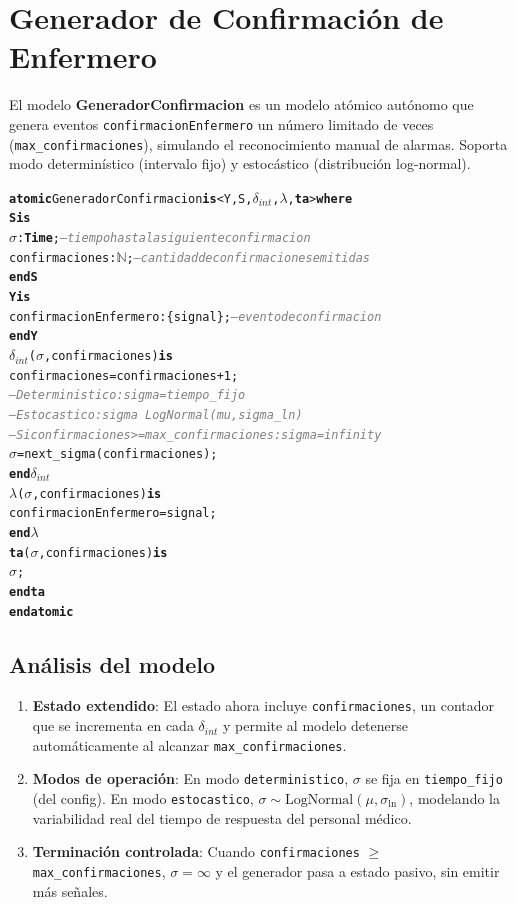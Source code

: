 \documentclass[12pt, a4paper]{article}
\newcommand{\cmlN}{$\mathbb{N}$}
\newcommand{\kw}[1]{\textbf{#1}}
\newcommand{\cmlTime}{\textbf{Time}}
\newcommand{\cmlsigma}{$\sigma$}
\newcommand{\dint}{$\delta_{\mathit{int}}$}
\newcommand{\clambda}{$\lambda$}
\newcommand{\cmlta}{\textbf{ta}}
\newcommand{\cmlcomment}[1]{\textit{\textcolor{gray}{#1}}}
\newenvironment{cmldevs}{%
  \begin{alltt}\small%
}{%
  \end{alltt}%
}
\begin{document}
\section{Generador de Confirmación de Enfermero}

El modelo \textbf{GeneradorConfirmacion} es un modelo atómico autónomo que genera
eventos \texttt{confirmacionEnfermero} un número limitado de veces
(\texttt{max\_confirmaciones}), simulando el reconocimiento manual de alarmas.
Soporta modo determinístico (intervalo fijo) y estocástico (distribución log-normal).

\begin{center}
\begin{cmldevs}
\kw{atomic} GeneradorConfirmacion \kw{is} <Y, S, \dint{}, \clambda{}, \cmlta{}> \kw{where}
\kw{S is}
    \cmlsigma{}          : \cmlTime{};  \cmlcomment{-- tiempo hasta la siguiente confirmacion}
    confirmaciones : \cmlN{};     \cmlcomment{-- cantidad de confirmaciones emitidas}
\kw{end S}
\kw{Y is}
    confirmacionEnfermero : \{signal\};  \cmlcomment{-- evento de confirmacion}
\kw{end Y}
\dint{}(\cmlsigma{}, confirmaciones) \kw{is}
    confirmaciones = confirmaciones + 1;
    \cmlcomment{-- Deterministico: sigma = tiempo\_fijo}
    \cmlcomment{-- Estocastico:    sigma ~ LogNormal(mu, sigma\_ln)}
    \cmlcomment{-- Si confirmaciones >= max\_confirmaciones: sigma = infinity}
    \cmlsigma{} = next\_sigma(confirmaciones);
\kw{end} \dint{}
\clambda{}(\cmlsigma{}, confirmaciones) \kw{is}
    confirmacionEnfermero = signal;
\kw{end} \clambda{}
\cmlta{}(\cmlsigma{}, confirmaciones) \kw{is}
    \cmlsigma{};
\kw{end} \cmlta{}
\kw{end atomic}
\end{cmldevs}
\label{fig:generador-confirmacion}
\end{center}

\subsection*{Análisis del modelo}

\begin{enumerate}
    \item \textbf{Estado extendido}: El estado ahora incluye \texttt{confirmaciones},
    un contador que se incrementa en cada $\delta_{\mathit{int}}$ y permite al modelo
    detenerse automáticamente al alcanzar \texttt{max\_confirmaciones}.

    \item \textbf{Modos de operación}: En modo \texttt{deterministico}, $\sigma$
    se fija en \texttt{tiempo\_fijo} (del config). En modo \texttt{estocastico},
    $\sigma \sim \text{LogNormal}(\mu, \sigma_{\ln})$, modelando la variabilidad
    real del tiempo de respuesta del personal médico.

    \item \textbf{Terminación controlada}: Cuando \texttt{confirmaciones}
    $\geq$ \texttt{max\_confirmaciones}, $\sigma = \infty$ y el generador
    pasa a estado pasivo, sin emitir más señales.
\end{enumerate}
\end{document}
